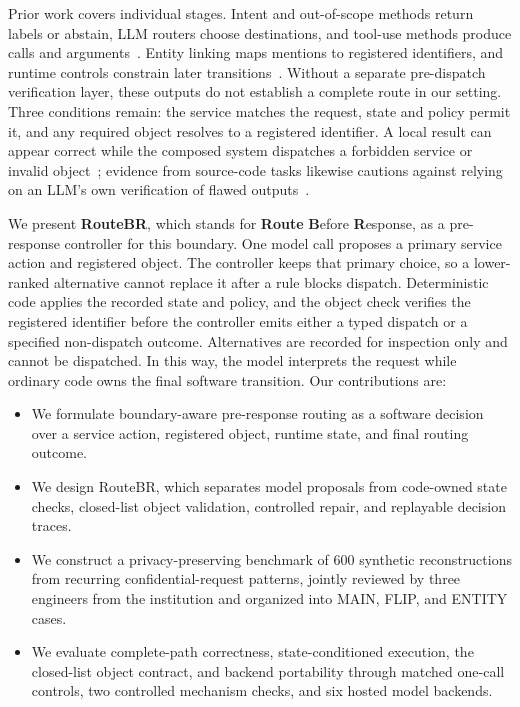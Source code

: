 \documentclass[10pt,conference,a4paper]{IEEEtran}
\newcommand{\method}{RouteBR}
\begin{document}
Prior work covers individual stages. Intent and out-of-scope methods return labels or abstain, LLM routers choose destinations, and tool-use methods produce calls and arguments~\cite{larson2019evaluation,hendrickx2024machine,ong2025routellm,patil2024gorilla}. Entity linking maps mentions to registered identifiers, and runtime controls constrain later transitions~\cite{wu2020scalable,rebedea2023nemo,yang2025adaptiveguard,wang2025agentspec}. Without a separate pre-dispatch verification layer, these outputs do not establish a complete route in our setting. Three conditions remain: the service matches the request, state and policy permit it, and any required object resolves to a registered identifier. A local result can appear correct while the composed system dispatches a forbidden service or invalid object~\cite{ruan2024identifying,debenedetti2024agentdojo,zhan2024injecagent,xue2025characterization}; evidence from source-code tasks likewise cautions against relying on an LLM's own verification of flawed outputs~\cite{yu2024fight}.

We present \textbf{\method}, which stands for \textbf{Route} \textbf{B}efore \textbf{R}esponse, as a pre-response controller for this boundary. One model call proposes a primary service action and registered object. The controller keeps that primary choice, so a lower-ranked alternative cannot replace it after a rule blocks dispatch. Deterministic code applies the recorded state and policy, and the object check verifies the registered identifier before the controller emits either a typed dispatch or a specified non-dispatch outcome. Alternatives are recorded for inspection only and cannot be dispatched. In this way, the model interprets the request while ordinary code owns the final software transition. Our contributions are:

\begin{itemize}[leftmargin=*,nosep]
  \item We formulate boundary-aware pre-response routing as a software decision over a service action, registered object, runtime state, and final routing outcome.
  \item We design \method, which separates model proposals from code-owned state checks, closed-list object validation, controlled repair, and replayable decision traces.
  \item We construct a privacy-preserving benchmark of 600 synthetic reconstructions from recurring confidential-request patterns, jointly reviewed by three engineers from the institution and organized into MAIN, FLIP, and ENTITY cases.
  \item We evaluate complete-path correctness, state-conditioned execution, the closed-list object contract, and backend portability through matched one-call controls, two controlled mechanism checks, and six hosted model backends.
\end{itemize}
\end{document}
